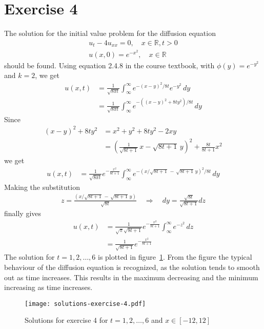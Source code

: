 \documentclass[11pt]{article}
\newcommand\myreal{\mathbb{R}}
\newcommand\infint{\int_{\infty}^{\infty}}
\begin{document}
\section*{Exercise 4}
The solution for the initial value problem for the diffusion equation
\begin{gather*}
    u_t - 4u_{xx} = 0, \quad x\in\myreal, t>0 \\
    u(x, 0) = e^{-x^2}, \quad x\in\myreal
\end{gather*}
should be found. Using equation 2.4.8 in the course textbook, with $\phi(y)=e^{-y^2}$ and $k=2$, we get
\begin{align*}
    u(x, t) &= \frac{1}{\sqrt{8\pi t}} \infint e^{-(x-y)^2/8t}e^{-y^2}\, dy \\
            &= \frac{1}{\sqrt{8\pi t}} \infint e^{-((x-y)^2+8ty^2)/8t}\, dy
\end{align*}
Since
\begin{align*}
    (x-y)^2+8ty^2 &= x^2 + y^2 + 8ty^2 - 2xy \\
                  &= \left(\frac{1}{\sqrt{8t+1}}\,x - \sqrt{8t+1}\,y\right)^2 + \frac{8t}{8t+1}x^2
\end{align*}
we get
\begin{align*}
    u(x, t) &= \frac{1}{\sqrt{8\pi t}}e^{-\frac{x^2}{8t+1}} \infint e^{-(x/\sqrt{8t+1}\,-\,\sqrt{8t+1}\,y)^2/8t}\, dy
\end{align*}
Making the substitution
\begin{align*}
    z = \frac{(x/\sqrt{8t+1}\,-\,\sqrt{8t+1}\,y)}{\sqrt{8t}} \quad\Rightarrow\quad dy=\frac{\sqrt{8t}}{\sqrt{8t+1}}dz 
\end{align*}
finally gives
\begin{align*}
    u(x, t) &= \frac{1}{\sqrt{\pi}\sqrt{8t+1}}e^{-\frac{x^2}{8t+1}} \infint e^{-z^2}\, dz \\
    &= \frac{1}{\sqrt{8t+1}}e^{-\frac{x^2}{8t+1}}
\end{align*}
The solution for $t=1,2,\dots,6$ is plotted in figure~\ref{fig:ex4-solutions}. From the figure the typical behaviour of the diffusion equation is recognized, as the solution tends to smooth out as time increases. This results in the maximum decreasing and the minimum increasing as time increases.
\begin{figure}
    \centering
    \texttt{[image: solutions-exercise-4.pdf]}
    \caption{Solutions for exercise 4 for $t=1,2,\dots,6$ and $x\in[-12,12]$}\label{fig:ex4-solutions}
\end{figure}
\end{document}
